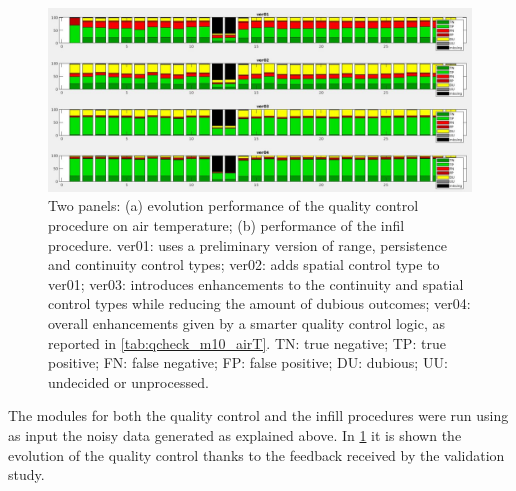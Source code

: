 \documentclass[authoryear,preprint,review,12pt]{elsarticle}
\begin{document}
\begin{figure}
	\centering
	\includegraphics[scale=.35]{figures/qcheck_perturbation_study.jpeg}
	\caption{ Two panels: (a) evolution performance of the quality control procedure on air temperature; (b) performance of the infil procedure.
    ver01: uses a preliminary version of range, persistence and continuity control types; ver02: adds spatial control type to ver01; ver03: introduces enhancements to the continuity and spatial control types while reducing the amount of dubious outcomes; ver04: overall enhancements given by a smarter quality control logic, as reported in \cref{tab:qcheck_m10_airT}. TN: true negative; TP: true positive; FN: false negative; FP: false positive; DU: dubious; UU: undecided or unprocessed. }
	\label{fig:perturbationCharts}
\end{figure}

The modules for both the quality control and the infill procedures were run using as input the noisy data generated as explained above.
In \cref{fig:perturbationCharts} it is shown the evolution of the quality control thanks to the feedback received by the validation study.



\end{document}
